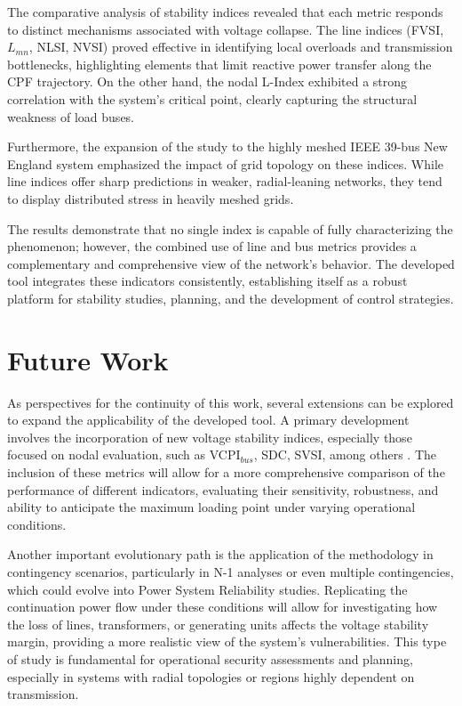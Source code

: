 \documentclass{ieeeaccess}
\begin{document}
The comparative analysis of stability indices revealed that each metric responds to distinct mechanisms associated with voltage collapse. The line indices (FVSI, $L_{mn}$, NLSI, NVSI) proved effective in identifying local overloads and transmission bottlenecks, highlighting elements that limit reactive power transfer along the CPF trajectory. On the other hand, the nodal L-Index exhibited a strong correlation with the system's critical point, clearly capturing the structural weakness of load buses. 

Furthermore, the expansion of the study to the highly meshed IEEE 39-bus New England system emphasized the impact of grid topology on these indices. While line indices offer sharp predictions in weaker, radial-leaning networks, they tend to display distributed stress in heavily meshed grids. 

The results demonstrate that no single index is capable of fully characterizing the phenomenon; however, the combined use of line and bus metrics provides a complementary and comprehensive view of the network's behavior. The developed tool integrates these indicators consistently, establishing itself as a robust platform for stability studies, planning, and the development of control strategies.

\section{Future Work}
\label{sec:future}

As perspectives for the continuity of this work, several extensions can be explored to expand the applicability of the developed tool. A primary development involves the incorporation of new voltage stability indices, especially those focused on nodal evaluation, such as VCPI$_{bus}$, SDC, SVSI, among others \cite{modarresi2016comprehensive}. The inclusion of these metrics will allow for a more comprehensive comparison of the performance of different indicators, evaluating their sensitivity, robustness, and ability to anticipate the maximum loading point under varying operational conditions.

Another important evolutionary path is the application of the methodology in contingency scenarios, particularly in N-1 analyses or even multiple contingencies, which could evolve into Power System Reliability studies. Replicating the continuation power flow under these conditions will allow for investigating how the loss of lines, transformers, or generating units affects the voltage stability margin, providing a more realistic view of the system's vulnerabilities. This type of study is fundamental for operational security assessments and planning, especially in systems with radial topologies or regions highly dependent on transmission.
\end{document}
